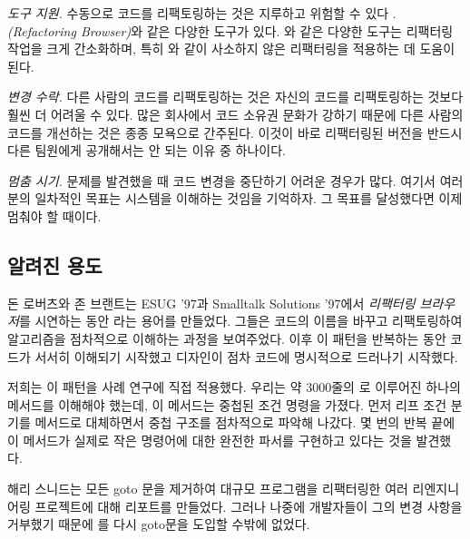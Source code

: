 \documentclass[a4paper,10pt,twoside]{book}
\begin{document}
\begin{bulletlist}
\item \emph{도구 지원.}
수동으로 코드를 리팩토링하는 것은 지루하고 위험할 수 있다 \cite{Fowl99a}. \emph{(Refactoring Browser)}와 같은 다양한 도구가 있다. \cite{Robe97a}와 같은 다양한 도구는 리팩터링 작업을 크게 간소화하며, 특히 와 같이 사소하지 않은 리팩터링을 적용하는 데 도움이 된다.

\item \emph{변경 수락.}
다른 사람의 코드를 리팩토링하는 것은 자신의 코드를 리팩토링하는 것보다 훨씬 더 어려울 수 있다. 많은 회사에서 코드 소유권 문화가 강하기 때문에 다른 사람의 코드를 개선하는 것은 종종 모욕으로 간주된다. 이것이 바로 리팩터링된 버전을 반드시 다른 팀원에게 공개해서는 안 되는 이유 중 하나이다.

\item \emph{멈춤 시기.}
문제를 발견했을 때 코드 변경을 중단하기 어려운 경우가 많다. 여기서 여러분의 일차적인 목표는 시스템을 이해하는 것임을 기억하자. 그 목표를 달성했다면 이제 멈춰야 할 때이다. 
\end{bulletlist}

\subsection*{알려진 용도}

돈 로버츠와 존 브랜트는 ESUG '97과 Smalltalk Solutions '97에서 \emph{리팩터링 브라우저}를 시연하는 동안 라는 용어를 만들었다. 그들은 코드의 이름을 바꾸고 리팩토링하여 알고리즘을 점차적으로 이해하는 과정을 보여주었다. 이후 이 패턴을 반복하는 동안 코드가 서서히 이해되기 시작했고 디자인이 점차 코드에 명시적으로 드러나기 시작했다. 

저희는 이 패턴을  사례 연구에 직접 적용했다. 우리는 약 3000줄의 로 이루어진 하나의 메서드를 이해해야 했는데, 이 메서드는 중첩된 조건 명령을 가졌다. 먼저 리프 조건 분기를 메서드로 대체하면서 중첩 구조를 점차적으로 파악해 나갔다. 몇 번의 반복 끝에 이 메서드가 실제로 작은 명령어에 대한 완전한 파서를 구현하고 있다는 것을 발견했다. 

해리 스니드는 모든 goto 문을 제거하여 대규모  프로그램을 리팩터링한 여러 리엔지니어링 프로젝트에 대해 리포트를 만들었다. 그러나 나중에 개발자들이 그의 변경 사항을 거부했기 때문에 \cite{Snee99a}를 다시 goto문을 도입할 수밖에 없었다.
\end{document}
